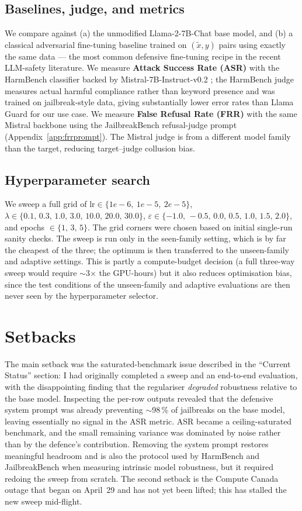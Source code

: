 \documentclass[11pt]{article}
\begin{document}
\subsection{Baselines, judge, and metrics}
We compare against (a) the unmodified Llama-2-7B-Chat base model, and (b) a
classical adversarial fine-tuning baseline trained on $(\tilde{x},y)$ pairs
using exactly the same data --- the most common defensive fine-tuning recipe
in the recent LLM-safety literature.
We measure \textbf{Attack Success Rate (ASR)} with the HarmBench classifier
\citep{mazeika2024harmbench} backed by Mistral-7B-Instruct-v0.2
\citep{jiang2023mistral}; the HarmBench judge measures actual harmful
compliance rather than keyword presence and was trained on jailbreak-style
data, giving substantially lower error rates than Llama Guard for our use
case. We measure \textbf{False Refusal Rate (FRR)} with the same Mistral
backbone using the JailbreakBench refusal-judge prompt
(Appendix~\ref{app:frrprompt}). The Mistral judge is from a different model
family than the target, reducing target--judge collusion bias.

\subsection{Hyperparameter search}\label{sec:hpsearch}
We sweep a full grid of
$\text{lr}\in\{1e\!-\!6,\ 1e\!-\!5,\ 2e\!-\!5\}$,
$\lambda\in\{0.1,\,0.3,\,1.0,\,3.0,\,10.0,\,20.0,\,30.0\}$,
$\varepsilon\in\{-1.0,\,-0.5,\,0.0,\,0.5,\,1.0,\,1.5,\,2.0\}$,
and epochs $\in\{1,\,3,\,5\}$. The grid corners were chosen based on initial
single-run sanity checks. The sweep is run only in the seen-family setting,
which is by far the cheapest of the three; the optimum is then transferred to
the unseen-family and adaptive settings. This is partly a compute-budget
decision (a full three-way sweep would require $\sim$3$\times$ the GPU-hours)
but it also reduces optimisation bias, since the test conditions of the
unseen-family and adaptive evaluations are then never seen by the
hyperparameter selector.

\section{Setbacks}
The main setback was the saturated-benchmark issue described in the
``Current Status'' section: I had originally completed a sweep and an
end-to-end evaluation, with the disappointing finding that the regulariser
\emph{degraded} robustness relative to the base model. Inspecting the per-row
outputs revealed that the defensive system prompt was already preventing
$\sim$98\,\% of jailbreaks on the base model, leaving essentially no signal in
the ASR metric. ASR became a ceiling-saturated benchmark, and the small
remaining variance was dominated by noise rather than by the defence's
contribution. Removing the system prompt restores meaningful headroom and is
also the protocol used by HarmBench and JailbreakBench when measuring
intrinsic model robustness, but it required redoing the sweep from scratch.
The second setback is the Compute Canada outage that began on April~29 and
has not yet been lifted; this has stalled the new sweep mid-flight.
\end{document}
